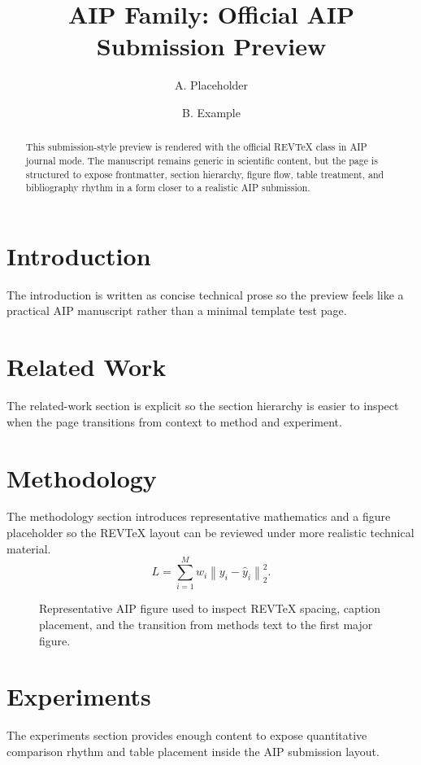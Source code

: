 \documentclass[aip,apl,reprint]{revtex4-2}
\begin{document}
\title{AIP Family: Official AIP Submission Preview}
\author{A. Placeholder}
\author{B. Example}
\begin{abstract}
This submission-style preview is rendered with the official REVTeX class in AIP journal mode. The manuscript remains generic in scientific content, but the page is structured to expose frontmatter, section hierarchy, figure flow, table treatment, and bibliography rhythm in a form closer to a realistic AIP submission.
\end{abstract}
\maketitle
\section{Introduction}
The introduction is written as concise technical prose so the preview feels like a practical AIP manuscript rather than a minimal template test page.
\section{Related Work}
The related-work section is explicit so the section hierarchy is easier to inspect when the page transitions from context to method and experiment.
\section{Methodology}
The methodology section introduces representative mathematics and a figure placeholder so the REVTeX layout can be reviewed under more realistic technical material.
\begin{equation}
L = \sum_{i=1}^{M} w_i \left\| y_i - \hat{y}_i \right\|_2^2.
\end{equation}
\begin{figure}[t]
\centering
{}
\caption{Representative AIP figure used to inspect REVTeX spacing, caption placement, and the transition from methods text to the first major figure.}
\end{figure}
\section{Experiments}
The experiments section provides enough content to expose quantitative comparison rhythm and table placement inside the AIP submission layout.
\end{document}
